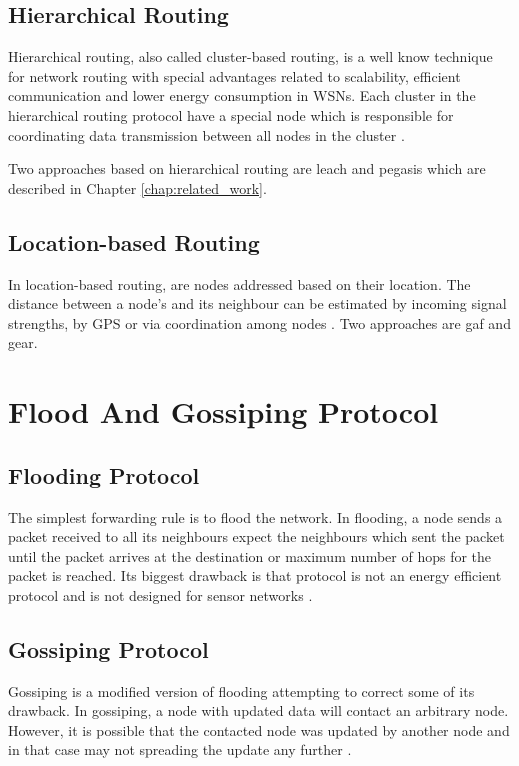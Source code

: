\documentclass[USenglish]{uit-thesis}
\begin{document}
\subsection{Hierarchical Routing}
Hierarchical routing, also called cluster-based routing, is a well know technique for network routing with special advantages related to scalability, efficient communication and lower energy consumption in WSNs. Each cluster in the hierarchical routing protocol have a special node which is responsible for coordinating data transmission between all nodes in the cluster \cite{leach, leach_perf, routing_survey}.


Two approaches based on hierarchical routing are \gls{leach}\cite{leach} and \gls{pegasis}\cite{pegasis} which are described in Chapter \ref{chap:related_work}.


\subsection{Location-based Routing}
In location-based routing, are nodes addressed based on their location. The distance between a node's and its neighbour can be estimated by incoming signal strengths, by GPS or via coordination among nodes \cite{routing_survey}. Two approaches are \gls{gaf}\cite{gaf} and \gls{gear}\cite{gear}.


\section{Flood And Gossiping Protocol}
\subsection{Flooding Protocol}
The simplest forwarding rule is to flood the network. In flooding, a node sends a packet received to all its neighbours expect the neighbours which sent the packet until the packet arrives at the destination or maximum number of hops for the packet is reached. Its biggest drawback is that protocol is not an energy efficient protocol and is not designed for sensor networks \cite{wsnbook}.

\subsection{Gossiping Protocol}
Gossiping is a modified version of flooding attempting to correct some of its drawback. In gossiping, a node with updated data will contact an arbitrary node. However, it is possible that the contacted node was updated by another node and in that case may not spreading the update any further \cite{dsbook}.
\end{document}
